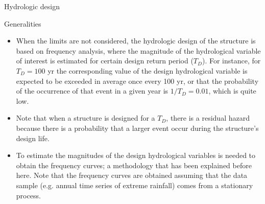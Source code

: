 \documentclass[8pt]{beamer}
\renewcommand{\emph}[1]{\textcolor{myorange}{#1}}
\begin{document}
\begin{frame}{Hydrologic design}
   \begin{block}{Generalities}
   \end{block}
   \begin{itemize}
       \item When the limits are not considered, the \emph{hydrologic design} of the structure is based on \emph{frequency analysis}, where the magnitude of the hydrological variable of interest is estimated for certain \emph{design return period ($T_D$)}. For instance,   for $T_D =100$ yr the corresponding value of the design hydrological variable is expected to be exceeded in average once every 100 yr, or that the probability of the occurrence of that event in a given year is $1/T_D = 0.01$, which is quite low. 
       \item Note that when a structure is designed for a $T_D$, there is a \emph{residual hazard} because  there is a probability that a larger event occur during the \emph{structure's design life}.
       \item To estimate the magnitudes of the design hydrological variables is needed to obtain the \emph{frequency curves}; a methodology that has been explained before here. Note that the \emph{frequency curves} are obtained assuming that the data sample (e.g. annual time series of extreme rainfall) comes from a \emph{stationary process}.  
   \end{itemize}
\end{frame}
\end{document}
